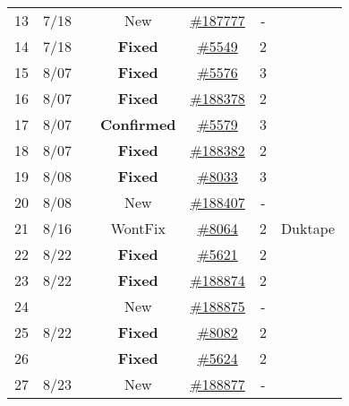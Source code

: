 \begin{table}[t!]
\begin{tabular}{rcccccc}
       13 & 7/18  & \jsc{} & New & \href{https://bugs.webkit.org/show_bug.cgi?id=187777}{\#187777} & - & \jerry{}\\
       14 & 7/18  & \chakra{} & \textbf{Fixed} & \href{\repoCH/issues/5549}{\#5549} & 2 & \jerry{}\\ %
       15 & 8/07  & \chakra{} & \textbf{Fixed} & \href{\repoCH/issues/5576}{\#5576} & 3 & \jerry{}\\
       16 & 8/07  & \jsc{} & \textbf{Fixed} & \href{https://bugs.webkit.org/show_bug.cgi?id=188378}{\#188378} & 2 & \jerry{}\\
       17 & 8/07  & \chakra{} & \textbf{Confirmed} & \href{\repoCH/issues/5579}{\#5579} & 3 & \jerry{}\\
       18 & 8/07  & \jsc{} & \textbf{Fixed} & \href{https://bugs.webkit.org/show_bug.cgi?id=188382}{\#188382} & 2 & \jerry{}\\
       19 & 8/08  & \veight{} & \textbf{Fixed} & \href{https://bugs.chromium.org/p/v8/issues/detail?id=8033}{\#8033} & 3 & \jerry{}\\
       20 & 8/08  & \jsc{} & New & \href{https://bugs.webkit.org/show_bug.cgi?id=188407}{\#188407} & - & \jerry{}\\
       21 & 8/16  & \veight{} & WontFix & \href{https://bugs.chromium.org/p/v8/issues/detail?id=8064}{\#8064} & 2 & Duktape\\
       22 & 8/22  & \chakra{} & \textbf{Fixed} & \href{\repoCH/issues/5621}{\#5621} & 2 & \smonkey{}\\
       23 & 8/22  & \jsc{} & \textbf{Fixed} & \href{https://bugs.webkit.org/show_bug.cgi?id=188874}{\#188874} & 2 & \smonkey{}\\
       24 & \multirow{3}{*}{8/22} & \jsc{} & New & \href{https://bugs.webkit.org/show_bug.cgi?id=188875}{\#188875} & - & \smonkey{}\\
       25 &  & \veight{} & \textbf{Fixed} & \href{https://bugs.chromium.org/p/v8/issues/detail?id=8082}{\#8082} &  2  & \smonkey{}\\
       26 &  & \chakra{} & \textbf{Fixed} & \href{https://github.com/Microsoft/ChakraCore/issues/5624}{\#5624} &  2  & \smonkey{}\\
       27 & 8/23  & \jsc{} & New & \href{https://bugs.webkit.org/show_bug.cgi?id=188877}{\#188877} & - & \smonkey{}\\
       \bottomrule
      \end{tabular}
      \vspace{-2ex}
\end{table}
